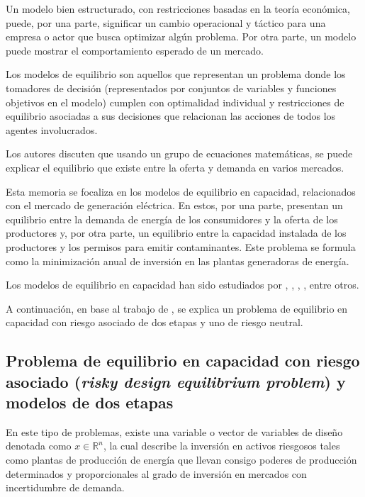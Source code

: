 Un modelo bien estructurado, con restricciones basadas en la teoría económica, puede, por una parte, significar un cambio operacional y táctico para una empresa o actor que busca optimizar algún problema. Por otra parte, un modelo puede mostrar el comportamiento esperado de un mercado.
\vspace{2.5mm}

Los modelos de equilibrio son aquellos que representan un problema donde los tomadores de decisión (representados por conjuntos de variables y funciones objetivos en el modelo) cumplen con optimalidad individual y restricciones de equilibrio asociadas a sus decisiones que relacionan las acciones de todos los agentes involucrados.
\vspace{2.5mm}

Los autores   discuten que usando un grupo de ecuaciones matemáticas, se puede explicar el equilibrio que existe entre la oferta y demanda en varios mercados.
\vspace{2.5mm}

Esta memoria se focaliza en los modelos de equilibrio en capacidad, relacionados con el mercado de generación eléctrica. En estos, por una parte, presentan un equilibrio entre la demanda de energía de los consumidores y la oferta de los productores y, por otra parte, un equilibrio entre la capacidad instalada de los productores y los permisos para emitir contaminantes. Este problema se formula como la minimización anual de inversión en las plantas generadoras de energía.
\vspace{2.5mm}

Los modelos de equilibrio en capacidad han sido estudiados por , , , , entre otros.
\vspace{2.5mm}

A continuación, en base al trabajo de , se explica un problema de equilibrio en capacidad con riesgo asociado de dos etapas y uno de riesgo neutral.

\subsection{Problema de equilibrio en capacidad con riesgo asociado (\textit{risky design equilibrium problem}) y modelos de dos etapas}

En este tipo de problemas, existe una variable o vector de variables de diseño denotada como  $x \in \mathbb{R}^{n}$, la cual describe la inversión en activos riesgosos tales como plantas de producción de energía que llevan consigo poderes de producción determinados y proporcionales al grado de inversión en mercados con incertidumbre de demanda.
\vspace{2.5mm}

